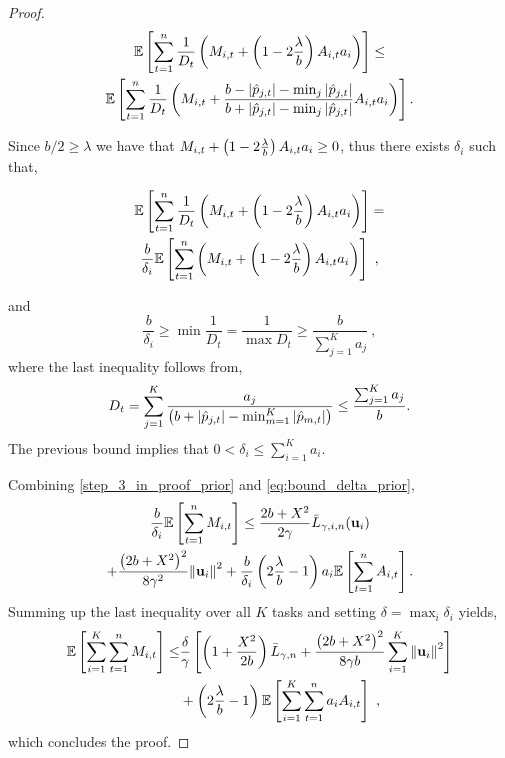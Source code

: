 {\begin{proof}
\begin{multline*}
\mathbb{E}\left[{\sum_{t=1}^{n}{\frac{1}{D_{t}}}\left({M_{i,t}+\left({1-2\frac{\lambda}{b}}\right)A_{i,t}a_{i} }\right)}\right]
\le \\
\mathbb{E}\left[ \sum_{t=1}^{n}{\frac{1}{D_{t}}}\left({M_{i,t}+\frac{b-\left\vert{\hat{p}_{j,t}}\right\vert-\min_{j}{\left\vert{\hat{p}_{j,t}}\right\vert }}{b+\left\vert{\hat{p}_{j,t}}\right\vert-\min_{j}{\left\vert{\hat{p}_{j,t}}\right\vert}}A_{i,t}a_{i} }\right) \right].
\end{multline*}

Since $b/2 \geq \lambda$ we have that
$M_{i,t}+\left({1-2\frac{\lambda}{b}}\right)A_{i,t}a_{i}\geq 0$, thus there
exists $\delta_i$ such that, 

\begin{multline}
  \label{eq:bound_delta_prior}
\mathbb{E}\left[
  \sum_{t=1}^{n}{\frac{1}{D_{t}}}\left({M_{i,t}+\left({1-2\frac{\lambda}{b}}\right)A_{i,t}a_{i}
  }\right) \right]= \\
  \frac{b}{\delta_i}\mathbb{E}\left[
  \sum_{t=1}^{n}\left({M_{i,t}+\left({1-2\frac{\lambda}{b}}\right)A_{i,t}a_{i}
  }\right) \right] ~,
\end{multline}

and 
\[
\frac{b}{\delta_i} \geq \min\frac{1}{D_t}  = \frac{1}{\max D_t}  \geq \frac{b}{\sum_{j=1}^Ka_{j}}~,
\]
where the last inequality follows from,
\begin{equation}\label{eq:bound_D}
D_{t}=\sum_{j=1}^K\frac{a_{j}}{\left({b+\left\vert{\hat{p}_{j,t}}\right\vert-\min_{m=1}^K\left\vert{\hat{p}_{m,t}}\right\vert}\right)}\le \frac{\sum_{j=1}^Ka_{j}}{b}.
\end{equation}
The previous bound implies that $0<\delta_i\le\sum_{i=1}^Ka_{i  }$.

Combining \eqref{step_3_in_proof_prior} and \eqref{eq:bound_delta_prior}, 
\begin{multline}
\label{eq:bound_for_i}
\frac{b}{\delta_i}\mathbb{E}\left[ \sum_{t=1}^{n}{M_{i,t}} \right]
\le \frac{2b+X^2}{2\gamma}{\bar L}_{\gamma,i,n}(\mathbf{u}_{i}) 
\\+\frac{\left({2b+X^2}\right)^2}{8{\gamma}^2}{\left\Vert \mathbf{u}_{i} \right\Vert}^2 
+\frac{b}{\delta_i}\left({2\frac{\lambda}{b}-1}\right)a_{i}\mathbb{E}\left[{\sum_{t=1}^{n}{A_{i,t}}}\right].
\end{multline}
Summing up the last inequality over all $K$ tasks and setting $\delta
= \max_i \delta_i$ yields,
\begin{equation}\label{eq:final_eq}
\begin{split}
\mathbb{E}\left[ \sum_{i=1}^{K}\sum_{t=1}^{n}{M_{i,t}} \right]
\le&\frac{\delta}{\gamma }\left[{\left(1+\frac{X^2}{2b} \right){\bar L}_{\gamma,n}+
\frac{\left({2b+X^2}\right)^2}{8{\gamma}b}\sum_{i=1}^{K}{{\left\Vert \mathbf{u}_{i} \right\Vert}^2}}\right]\\ 
&+
\left({2\frac{\lambda}{b}-1}\right)\mathbb{E}\left[{\sum_{i=1}^{K}\sum_{t=1}^{n}{a_{i}A_{i,t}}}\right]~,
\end{split}
\end{equation}
which concludes the proof.
\QED
\end{proof}

}
